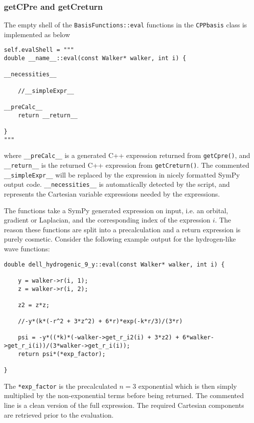 \subsubsection{getCPre and getCreturn}

The empty shell of the \verb+BasisFunctions::eval+ functions in the \verb+CPPbasis+ class is implemented as below

\vspace{0.5cm}
\begin{lstlisting}[otherkeywords={self}]
self.evalShell = """
double __name__::eval(const Walker* walker, int i) {

__necessities__
    
    //__simpleExpr__
    
__preCalc__
    return __return__
    
}
"""
\end{lstlisting}

where \verb+__preCalc__+ is a generated C++ expression returned from \verb+getCpre()+, and \verb+__return__+ is the returned C++ expression from \verb+getCreturn()+. The commented \verb+__simpleExpr__+ will be replaced by the expression in nicely formatted SymPy output code. \verb+__necessities__+ is automatically detected by the script, and represents the Cartesian variable expressions needed by the expressions.

The functions take a SymPy generated expression on input, i.e. an orbital, gradient or Laplacian, and the corresponding index of the expression $i$. The reason these functions are split into a precalculation and a return expression is purely cosmetic. Consider the following example output for the hydrogen-like wave functions:

\vspace{0.5cm}
\begin{lstlisting}
double dell_hydrogenic_9_y::eval(const Walker* walker, int i) {

    y = walker->r(i, 1);
    z = walker->r(i, 2);

    z2 = z*z;
    
    //-y*(k*(-r^2 + 3*z^2) + 6*r)*exp(-k*r/3)/(3*r)
    
    psi = -y*((*k)*(-walker->get_r_i2(i) + 3*z2) + 6*walker->get_r_i(i))/(3*walker->get_r_i(i));
    return psi*(*exp_factor);
    
}
\end{lstlisting}

The \verb+*exp_factor+ is the precalculated $n=3$ exponential which is then simply multiplied by the non-exponential terms before being returned. The commented line is a clean version of the full expression. The required Cartesian components are retrieved prior to the evaluation.

